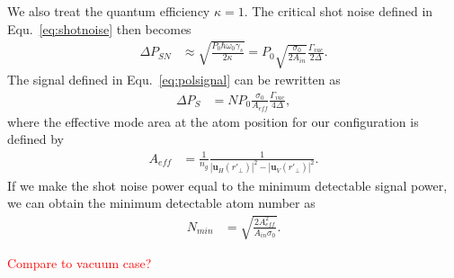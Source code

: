 We also treat the quantum efficiency $ \kappa=1 $. The critical shot noise defined in Equ.~\eqref{eq:shotnoise} then becomes
\begin{align}
\Delta P_{SN} &\approx \sqrt{\frac{P_0 \hbar \omega_0 \gamma_s}{2\kappa }} =P_0\sqrt{\frac{ \sigma_0 }{2A_{in}}}\frac{\Gamma_{vac}}{2\Delta}.
\end{align}
The signal defined in Equ.~\eqref{eq:polsignal} can be rewritten as
\begin{align}
\Delta P_S &= NP_0 \frac{\sigma_0}{A_{e\!f\!f}}\frac{\Gamma_{vac}}{4\Delta},
\end{align}
where the effective mode area at the atom position for our configuration is defined by
\begin{align}
A_{e\!f\!f} &= \frac{1}{n_g}\frac{1}{| \mathbf{u}_H(r'_{\!\perp})|^2- | \mathbf{u}_V(r'_{\!\perp})|^2}.
\end{align}
If we make the shot noise power equal to the minimum detectable signal power, we can obtain the minimum detectable atom number as
\begin{align}
N_{min} &= \sqrt{\frac{2A_{e\!f\!f}^2}{A_{in}\sigma_0}}.
\end{align}

\textcolor{red}{Compare to vacuum case?}


